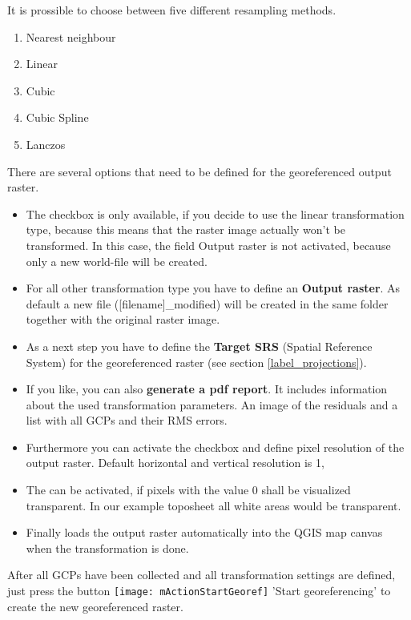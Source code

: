 It is prossible to choose between five different resampling methods.

\begin{enumerate}
\item Nearest neighbour
\item Linear
\item Cubic
\item Cubic Spline
\item Lanczos
\end{enumerate}


There are several options that need to be defined for the georeferenced output 
raster. 

\begin{itemize}[label=--]
\item The checkbox  is only available, if 
you decide to use the linear transformation type, because this means that 
the raster image actually won't be transformed. In this case, the field 
Output raster is not activated, because only a new world-file will be 
created.
\item For all other transformation type you have to define an \textbf{Output 
raster}. As default a new file ([filename]\_modified) will be created in 
the same folder together with the original raster image.   
\item As a next step you have to define the \textbf{Target SRS} 
(Spatial Reference System) for the georeferenced raster 
(see section \ref{label_projections}). 
\item If you like, you can also \textbf{generate a pdf report}. It includes 
information about the used transformation parameters. An image of the 
residuals and a list with all GCPs and their RMS errors.
\item Furthermore you can activate the  
checkbox and define pixel resolution of the output raster. Default horizontal 
and vertical resolution is 1,      
\item The  can be activated, if 
pixels with the value 0 shall be visualized transparent. In our example 
toposheet all white areas would be transparent.
\item Finally  loads the output raster 
automatically into the QGIS map canvas when the transformation is done.
\end{itemize}

\label{georeferencer_running}

After all GCPs have been collected and all transformation settings are 
defined, just press the button \texttt{[image: mActionStartGeoref]} 
'Start georeferencing' to create the new georeferenced raster.


